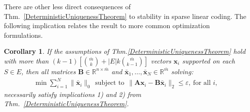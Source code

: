 \documentclass[9pt,twocolumn]{pnas-new}
\newtheorem{corollary}{Corollary}
\begin{document}
There are other less direct consequences of Thm.~\ref{DeterministicUniquenessTheorem} to stability in sparse linear coding.  The following implication relates the result to more common optimization formulations.


\begin{corollary}\label{SLCopt}
If the assumptions of Thm.\ref{DeterministicUniquenessTheorem} hold with more than $(k-1)\left[ {\bar m \choose k} + |E|k{\bar m \choose k-1}\right]$ vectors $\mathbf{x}_i$ supported on each $S \in E$, then all matrices $\mathbf{B} \in \mathbb{R}^{n \times \bar m}$ and $\mathbf{\bar x}_1, \ldots, \mathbf{\bar x}_N \in \mathbb{R}^{\bar m}$ solving:
\begin{align}\label{minsum}
\min \sum_{i = 1}^N \|\mathbf{\bar x}_i\|_0 \ \ 
\text{subject to} \ \ \|\mathbf{A}\mathbf{x}_i - \mathbf{B}\mathbf{\bar x}_i\|_2 \leq \varepsilon, \ \text{for all $i$},
\end{align}
%
necessarily satisfy implications 1) and 2) from Thm.~\ref{DeterministicUniquenessTheorem}.
\end{corollary}
\end{document}
